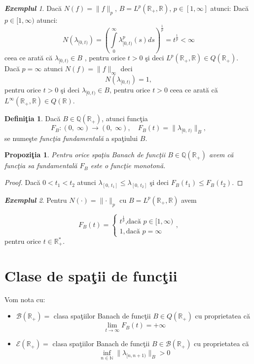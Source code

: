 \documentclass[ a4paper, 12pt]{report}
\newtheorem{prop}[theorem]{\bf Propozi\c tia }
\theoremstyle{definition}
\newtheorem{definition}{\bf Defini\c tia}[section]
\theoremstyle{remark}
\newtheorem{exemple}{\bf Exemplul}[section]
\numberwithin{equation}{section}
\begin{document}
\begin{exemple}
Dac\u a $N(f) = \lVert f \rVert_p$, $B = L^p(\mathbb{R}_+ , \mathbb{R})$, $p \in [1,\infty]$ atunci:
\smallskip
Dac\u a $ p \in [1,\infty)$ atunci:
$$N(\lambda_{[0,t)}) = \left(\int\limits_{0}^{\infty} \lambda_{[0,t)}^p (s)  ds\right)^ \frac{1}{p} = t^\frac{1}{p}<\infty$$ ceea ce arat\u a c\u a  $\lambda_{[0,t)}\in B$ , pentru orice $t>0$ \c si deci $L^p (\mathbb{R}_+,\mathbb{R}) \in Q(\mathbb{R}_+)$.
\smallskip
Dac\u a $p = \infty $ atunci $N(f) = \lVert f \rVert_{\infty}$ deci
$$N(\lambda_{[0,t)}) = 1,$$ pentru orice $t> 0$ \c si deci $\lambda_{[0,t)} \in B$, pentru orice $t>0$ ceea ce arat\u a c\u a $L^{\infty}(\mathbb{R}_+ , \mathbb{R}) \in Q(\mathbb{R})$.
\end{exemple}

\begin{definition}
Dac\u a $B\in \mathbb{Q}(\mathbb{R}_+)$, atunci func\c tia
$$F_B : (0,\; \infty) \rightarrow (0,\; \infty), \quad F_B(t) = \lVert \lambda_ {[0,\, t)} \rVert_B,$$ se nume\c ste {\it func\c tia fundamental\u a} a spa\c tiului $B$.
\end{definition}

\begin{prop}
Pentru orice spa\c tiu Banach de func\c tii $B\in \mathbb{Q}(\mathbb{R}_+)$ avem c\u a func\c tia sa fundamental\u a $F_B$ este o func\c tie monoton\u a.
\end{prop}

\begin{proof}
Dac\u a $0< t_1 < t_2$ atunci $\lambda_{[0,\, t_1]} \leqslant \lambda_{[0,\, t_2]}$ \c si deci $F_B{(t_1)}\leqslant F_B{(t_2)}$.
\end{proof}

\begin{exemple}
Pentru $N(\cdot) = \lVert \cdot \rVert_p$ cu $B = L^p(\mathbb{R}_+ , \mathbb{R})$ avem

$$F_B{(t)}= \begin{cases}
t^{\frac{1}{p}} \text{,dac\u a $p \in [1,\infty)$} \\
1 ,\text{dac\u a $p = \infty$}
\end{cases}, $$ pentru orice $t \in \mathbb{R}_+^{*}$.
\end{exemple}


\section{Clase de spa\c tii de func\c tii}

Vom nota cu:
\begin{itemize}
\item $\mathcal{B}(\mathbb{R}_+) =$ clasa spa\c tiilor Banach de func\c tii $B \in Q(\mathbb{R}_+)$ cu proprietatea c\u a
\[ \lim_{t \to \infty} F_B{(t)} = +\infty \]
\item $\mathcal{E}(\mathbb{R}_+) = $ clasa spa\c tiilor Banach de func\c tii $B \in \mathcal{B}(\mathbb{R}_+)$ cu proprietatea c\u a \[ \inf_{n \in \mathbb{N}} \lVert \lambda_{[n,n+1)} \rVert_B >0\]
\end{itemize}
\end{document}
